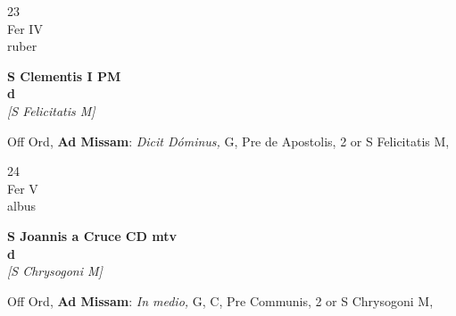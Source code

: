 \documentclass[10pt, openany]{book}
\begin{document}
        \begin{center}
            \begin{minipage}{3.5in}
                \vspace{2em}
                \begin{minipage}{0.5in}
                    {\Huge 23} \\
                    {\normalsize Fer IV} \\
                    {\normalsize ruber}
                \end{minipage}
                \begin{minipage}{3.0in}
                    \textbf{ \large S Clementis I PM \\
                    \textnormal{\normalsize d}} \\ \textit{[S Felicitatis M]} \\ 
                \end{minipage}
                \begin{justify}Off Ord, \textbf{Ad Missam}: \textit{Dicit Dóminus,} G, Pre de Apostolis, 2 or S Felicitatis M,  
                \end{justify}
            \end{minipage}
        \end{center}
    
        \begin{center}
            \begin{minipage}{3.5in}
                \vspace{2em}
                \begin{minipage}{0.5in}
                    {\Huge 24} \\
                    {\normalsize Fer V} \\
                    {\normalsize albus}
                \end{minipage}
                \begin{minipage}{3.0in}
                    \textbf{ \large S Joannis a Cruce CD mtv \\
                    \textnormal{\normalsize d}} \\ \textit{[S Chrysogoni M]} \\ 
                \end{minipage}
                \begin{justify}Off Ord, \textbf{Ad Missam}: \textit{In medio,} G, C, Pre Communis, 2 or S Chrysogoni M,  
                \end{justify}
            \end{minipage}
        \end{center}
    
\end{document}
